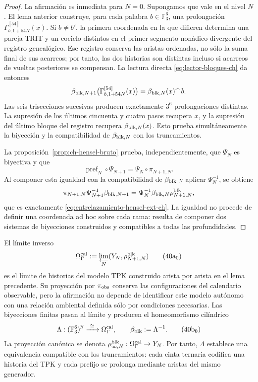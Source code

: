 \begin{proof}
La afirmación es inmediata para \(N=0\). Supongamos que vale en el nivel
\(N\). El lema anterior construye, para cada palabra
\(b\in\mathbb F_3^6\), una prolongación
    \(\Gamma_{b,1+54N}^{[54]}(x)\). Si \(b\ne b'\), la primera coordenada en la
que difieren determina una pareja TRIT y un cociclo distintos en el primer
segmento nonádico divergente del registro genealógico. Ese registro conserva
las aristas ordenadas, no sólo la suma final de sus acarreos; por tanto, las dos
historias son distintas incluso si acarreos de vueltas posteriores se
compensan. La lectura directa \eqref{eq:lector-bloques-ch} da entonces
\begin{equation}
 \beta_{{\rm blk},N+1}
 \bigl(\Gamma_{b,1+54N}^{[54]}(x)\bigr)
 =\beta_{{\rm blk},N}(x)^\frown b.
 \label{eq:beta-concatenacion-demostrada-ch}
\end{equation}
Las seis trisecciones sucesivas producen exactamente \(3^6\) prolongaciones
distintas. La supresión de los últimos cincuenta y cuatro pasos recupera
\(x\), y la supresión del último bloque del registro recupera
\(\beta_{{\rm blk},N}(x)\). Esto prueba simultáneamente la biyección y la
compatibilidad de \(\beta_{{\rm blk},N}\) con los truncamientos.

La proposición~\ref{prop:ch-hensel-bruto} prueba, independientemente, que
\(\Psi_N\) es biyectiva y que
\[
 \operatorname{pref}_N\circ\Psi_{N+1}
 =\Psi_N\circ\pi_{N+1,N}.
\]
Al componer esta igualdad con la compatibilidad de \(\beta_{\rm blk}\) y
aplicar \(\Psi_N^{-1}\), se obtiene
\[
 \pi_{N+1,N}\Psi_{N+1}^{-1}\beta_{{\rm blk},N+1}
 =\Psi_N^{-1}\beta_{{\rm blk},N}\rho^{\rm blk}_{N+1,N},
\]
que es exactamente \eqref{eq:entrelazamiento-hensel-ext-ch}. La igualdad no
procede de definir una coordenada ad hoc sobre cada rama: resulta de componer
dos sistemas de biyecciones construidos y compatibles a todas las
profundidades.
\end{proof}

El límite inverso
\[
 \Omega_\Gamma^{\rm cal}:=
 \varprojlim_N(Y_N,\rho^{\rm blk}_{N+1,N})
\tag{40a$_0$}
\label{eq:omega-gamma-catalogal-ch}
\]
es el límite de historias del modelo TPK construido arista por
arista en el lema precedente. Su proyección por \(\pi_{\rm obs}\) conserva
las configuraciones del calendario observable, pero la afirmación no depende
de identificar este modelo autónomo con una relación ambiental definida sólo
por condiciones necesarias. Las biyecciones finitas pasan
al límite y producen el homeomorfismo cilíndrico
\[
 \Lambda:(\mathbb F_3^6)^{\mathbb N}
 \xrightarrow{\ \cong\ }\Omega_\Gamma^{\rm cal},
 \qquad
 \beta_{\rm blk}:=\Lambda^{-1}.
\tag{40b$_0$}
\label{eq:homeomorfismo-calibrado-ch}
\]
La proyección canónica se denota
\(\rho^{\rm blk}_{\infty,N}:\Omega_\Gamma^{\rm cal}\to Y_N\).
Por tanto, \(\Lambda\) establece una equivalencia compatible con los
truncamientos: cada cinta ternaria codifica una historia del TPK y cada
prefijo se prolonga mediante aristas del mismo generador.

